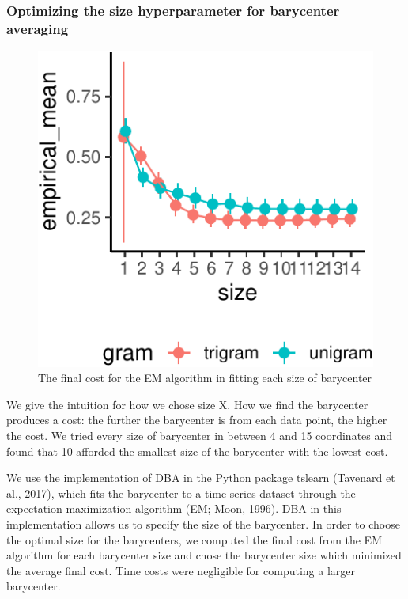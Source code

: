 \documentclass[
  english,
  man,floatsintext]{apa6}
\begin{document}
\hypertarget{optimizing-the-size-hyperparameter-for-barycenter-averaging}{%
\subsubsection{Optimizing the size hyperparameter for barycenter averaging}\label{optimizing-the-size-hyperparameter-for-barycenter-averaging}}

\begin{figure}[tb]

{\centering \includegraphics{figs/plotting-barycenters-1} 

}

\caption{The final cost for the EM algorithm in fitting each size of barycenter}\label{fig:plotting-barycenters}
\end{figure}

We give the intuition for how we chose size X. How we find the barycenter produces a cost: the further the barycenter is from each data point, the higher the cost. We tried every size of barycenter in between 4 and 15 coordinates and found that 10 afforded the smallest size of the barycenter with the lowest cost.

We use the implementation of DBA in the Python package tslearn (Tavenard et al., 2017), which fits the barycenter to a time-series dataset through the expectation-maximization algorithm (EM; Moon, 1996). DBA in this implementation allows us to specify the size of the barycenter. In order to choose the optimal size for the barycenters, we computed the final cost from the EM algorithm for each barycenter size and chose the barycenter size which minimized the average final cost. Time costs were negligible for computing a larger barycenter.
\end{document}
